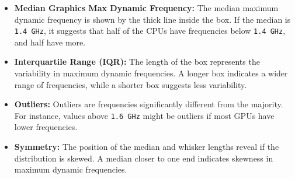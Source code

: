 \documentclass{article}
\begin{document}
\begin{itemize}
\begin{itemize}
\begin{itemize}
				\item \textbf{Median Graphics Max Dynamic Frequency:} The median maximum dynamic frequency is shown by the thick line inside the box. If the median is \texttt{1.4 GHz}, it suggests that half of the CPUs have frequencies below \texttt{1.4 GHz}, and half have more.
				\item \textbf{Interquartile Range (IQR):} The length of the box represents the variability in maximum dynamic frequencies. A longer box indicates a wider range of frequencies, while a shorter box suggests less variability.
				\item \textbf{Outliers:} Outliers are frequencies significantly different from the majority. For instance, values above \texttt{1.6 GHz} might be outliers if most GPUs have lower frequencies.
				\item \textbf{Symmetry:} The position of the median and whisker lengths reveal if the distribution is skewed. A median closer to one end indicates skewness in maximum dynamic frequencies.
			\end{itemize}
		\end{itemize}
	\end{itemize}
\end{document}
